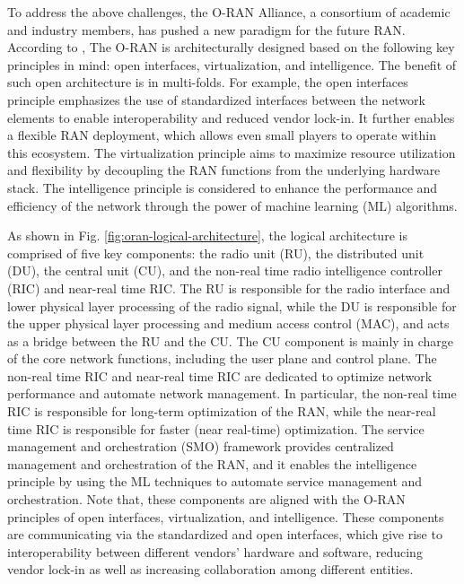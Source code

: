 \documentclass[]{IEEEtran}
\begin{document}
	
To address the above challenges, the O-RAN Alliance, a consortium of academic and industry members, has pushed a new paradigm for the future RAN. According to \cite{O-RAN.WG1.O-RAN-Architecture-Description-v07.00}, The O-RAN is architecturally designed based on the following key principles in mind: open interfaces, virtualization, and intelligence. The benefit of such open architecture is in multi-folds. For example, the open interfaces principle emphasizes the use of standardized interfaces between the network elements to enable interoperability and reduced vendor lock-in. It further  enables a flexible RAN deployment, which allows even small players to operate within this ecosystem. The virtualization principle aims to maximize resource utilization and flexibility by decoupling the RAN functions from the underlying hardware stack. The intelligence principle is considered to enhance the performance and efficiency of the network through the power of machine learning (ML) algorithms.  
	
	As shown in Fig. \ref{fig:oran-logical-architecture},  the logical architecture is comprised of five key components: the radio unit (RU), the distributed unit (DU), the central unit (CU), and the non-real time radio intelligence controller (RIC) and near-real time RIC. The RU is responsible for the radio interface and lower physical layer processing of the radio signal, while the DU is responsible for the upper physical layer processing and medium access control (MAC), and acts as a bridge between the RU and the CU. The CU component is mainly in charge of the core network functions, including the user plane and control plane. The non-real time RIC and near-real time RIC are dedicated to optimize network performance and automate network management. In particular, the non-real time RIC is responsible for long-term optimization of the RAN, while the near-real time RIC is responsible for faster (near real-time) optimization. The service management and orchestration (SMO) framework  provides centralized management and orchestration of the RAN, and it enables the intelligence principle by using the ML techniques to automate service management and orchestration. Note that, these components are aligned with the O-RAN principles of open interfaces, virtualization, and intelligence. These components are communicating via the standardized and open interfaces, which give rise to interoperability between different vendors' hardware and software, reducing vendor lock-in as well as increasing collaboration among different entities.
	
\end{document}
